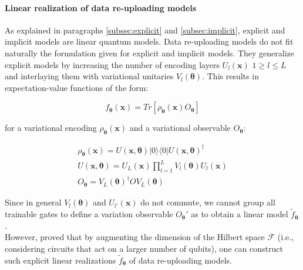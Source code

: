 \paragraph{Linear realization of data re-uploading models}

As explained in paragraphs \ref{subsec:explicit} and \ref{subsec:implicit}, explicit and implicit models are linear
quantum models.
Data re-uploading models do not fit naturally the formulation given for explicit and implicit models.
They generalize explicit models by increasing the number of encoding layers $U_l(\bm{x})$ $1 \ge l \le L$ and 
interlaying them with variational unitaries $V_l(\bm{\theta})$.
This results in expectation-value functions of the form:

\begin{equation}
    f_{\bm{\theta}}(\bm{x}) = Tr[\rho_{\bm{\theta}}(\bm{x}) O_{\bm{\theta}}]
\end{equation}

for a variational encoding $\rho_{\bm{\theta}}(\bm{x})$ and a variational observable $O_{\bm{\theta}}$:

\begin{align}
    \rho_{\bm{\theta}}(\bm{x}) = U(\bm{x}, \bm{\theta}) |0\rangle \langle 0| U(\bm{x}, \bm{\theta})^{\dagger} \\
    U(\bm{x}, \bm{\theta}) = U_L(\bm{x}) \prod_{l=1}^{L} V_l(\bm{\theta}) U_l(\bm{x}) \\
    O_{\bm{\theta}} = V_L(\bm{\theta})^{\dagger} O V_L(\bm{\theta})
\end{align}

Since in general $V_l(\bm{\theta})$ and $U_{l'}(\bm{x})$ do not commute, we cannot group all trainable gates to define
a variation observable $O_{\bm{\theta}}'$ as to obtain a linear model $\tilde{f}_{\bm{\theta}}$.\\
However, \cite{Jerbi_2023} proved that by augmenting the dimension of the Hilbert space $\mathcal{F}$ (i.e., considering 
circuits that act on a larger number of qubits), one can
construct such explicit linear realizations $\tilde{f}_{\bm{\theta}}$ of data re-uploading models.






